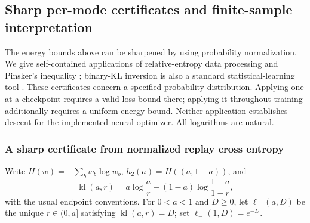 \documentclass{article}
\newcommand{\1}{\mathbf 1}
\theoremstyle{remark}
\theoremstyle{definition}
\theoremstyle{plain}
\begin{document}
\subsection{Sharp per-mode certificates and finite-sample interpretation}
\label{app:theory-survival-certificates}

The energy bounds above can be sharpened by using probability normalization.
We give self-contained applications of relative-entropy data processing and
Pinsker's inequality \citep[Theorems~9 and~31]{vanerven2014renyi}; binary-KL inversion is also a
standard statistical-learning tool \citep{garivier2011klucb}. These certificates
concern a specified probability distribution. Applying one at a checkpoint
requires a valid loss bound there; applying it throughout training additionally
requires a uniform energy bound. Neither application establishes descent for
the implemented neural optimizer. All logarithms are natural.

\subsubsection{A sharp certificate from normalized replay cross entropy}

Write $H(w)=-\sum_b w_b\log w_b$, $h_2(a)=H((a,1-a))$, and
\[
 \operatorname{kl}(a,r)
 =a\log\frac{a}{r}+(1-a)\log\frac{1-a}{1-r},
\]
with the usual endpoint conventions. For $0<a<1$ and $D\ge0$, let
$\ell_-(a,D)$ be the unique $r\in(0,a]$ satisfying
$\operatorname{kl}(a,r)=D$; set $\ell_-(1,D)=e^{-D}$.
\end{document}
